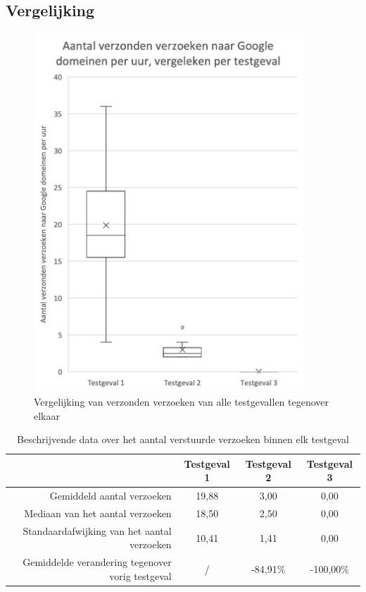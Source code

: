 \subsection{Vergelijking}

\begin{figure}
    \centering
    \includegraphics[width=0.9\textwidth]{experiment/grafieken/boxplot-compare.png}
    \caption{Vergelijking van verzonden verzoeken van alle testgevallen tegenover elkaar}
    \label{fig:boxplot-compare}
\end{figure}


\begin{table}[]
    \centering
    \begin{tabular}{@{}rccc@{}}
        \toprule
        & Testgeval 1 & Testgeval 2 & Testgeval 3 \\ \midrule
        Gemiddeld aantal verzoeken & 19,88 & 3,00 & 0,00 \\
        Mediaan van het aantal verzoeken & 18,50 & 2,50 & 0,00 \\
        Standaardafwijking van het aantal verzoeken & 10,41 & 1,41 & 0,00 \\
        Gemiddelde verandering tegenover vorig testgeval & / & -84,91\% & -100,00\% \\ \bottomrule
    \end{tabular}
    \caption{Beschrijvende data over het aantal verstuurde verzoeken binnen elk testgeval}
    \label{tab:misc-data}
\end{table}

